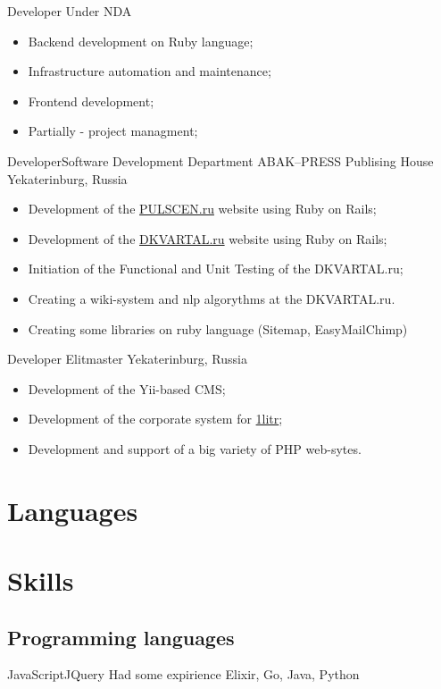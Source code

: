 \documentclass[11pt,a4paper]{moderncv}
\begin{document}
  {Developer}{}
  {Under NDA}
  {}
{
\begin{itemize}
  \item Backend development on Ruby language;
  \item Infrastructure automation and maintenance;
  \item Frontend development;
  \item Partially - project managment;
\end{itemize}
}

  {Developer}{Software Development Department}
  {ABAK--PRESS Publising House}
  {Yekaterinburg, Russia}
{
\begin{itemize}
  \item Development of the \href{http://pulscen.ru}{PULSCEN.ru} website using Ruby on Rails;
  \item Development of the \href{http://dkvartal.ru}{DKVARTAL.ru} website using Ruby on Rails;
  \item Initiation of the Functional and Unit Testing of the {DKVARTAL.ru};
  \item Creating a wiki-system and nlp algorythms at the {DKVARTAL.ru}.
  \item Creating some libraries on ruby language (Sitemap, EasyMailChimp)
\end{itemize}
}

\cvitem {}{}

  {Developer}{}
  {Elitmaster}
  {Yekaterinburg, Russia}
{
\begin{itemize}
  \item Development of the Yii-based CMS;
  \item Development of the corporate system for \href{1litr.elitmaster.com}{1litr};
  \item Development and support of a big variety of PHP web-sytes.
\end{itemize}
}


\section{Languages}

\section{Skills}

\subsection{Programming languages}
{JavaScript}{JQuery}
\cvcomputer
{Had some expirience} {Elixir, Go, Java, Python}
{}{}
\end{document}
